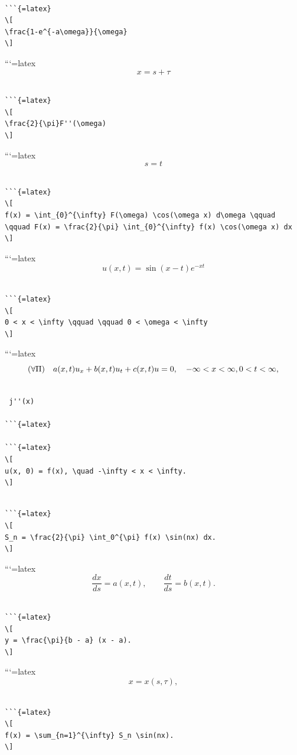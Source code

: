 \documentclass[
]{article}
\begin{document}
\begin{verbatim}

```{=latex}
\[
\frac{1-e^{-a\omega}}{\omega}
\]
\end{verbatim}

```{=latex}
\[
x = s + \tau
\]

\begin{verbatim}

```{=latex}
\[
\frac{2}{\pi}F''(\omega)
\]
\end{verbatim}

```{=latex}
\[
s=t
\]

\begin{verbatim}

```{=latex}
\[
f(x) = \int_{0}^{\infty} F(\omega) \cos(\omega x) d\omega \qquad \qquad F(x) = \frac{2}{\pi} \int_{0}^{\infty} f(x) \cos(\omega x) dx
\]
\end{verbatim}

```{=latex}
\[
u(x, t) = \sin(x-t)e^{-xt}
\]

\begin{verbatim}

```{=latex}
\[
0 < x < \infty \qquad \qquad 0 < \omega < \infty
\]
\end{verbatim}

```{=latex}
\[
(\forall \Pi) \quad a(x, t) u_x + b(x, t) u_t + c(x, t) u = 0, \quad -\infty < x < \infty, \\ 0 < t < \infty,
\]

\begin{verbatim}

 j''(x)

```{=latex}

```{=latex}
\[
u(x, 0) = f(x), \quad -\infty < x < \infty.
\]
\end{verbatim}

\begin{verbatim}

```{=latex}
\[
S_n = \frac{2}{\pi} \int_0^{\pi} f(x) \sin(nx) dx.
\]
\end{verbatim}

```{=latex}
\[
\frac{dx}{ds} = a(x, t), \qquad \frac{dt}{ds} = b(x, t).
\]

\begin{verbatim}

```{=latex}
\[
y = \frac{\pi}{b - a} (x - a).
\]
\end{verbatim}

```{=latex}
\[
x = x (s, \tau),
\]

\begin{verbatim}

```{=latex}
\[
f(x) = \sum_{n=1}^{\infty} S_n \sin(nx).
\]
\end{verbatim}
\end{document}
